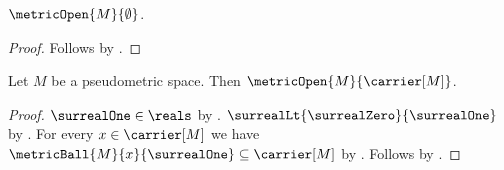 \begin{proposition}\label{metric_open_empty}
    $\metricOpen{M}{\emptyset}$.
\end{proposition}
\begin{proof}
    Follows by .
\end{proof}

\begin{proposition}\label{metric_open_carrier}
    Let $M$ be a pseudometric space.
    Then $\metricOpen{M}{\carrier[M]}$.
\end{proposition}
\begin{proof}
    $\surrealOne\in\reals$ by .
    $\surrealLt{\surrealZero}{\surrealOne}$
        by .
    For every $x\in\carrier[M]$ we have
        $\metricBall{M}{x}{\surrealOne}\subseteq\carrier[M]$
        by .
    Follows by .
\end{proof}

